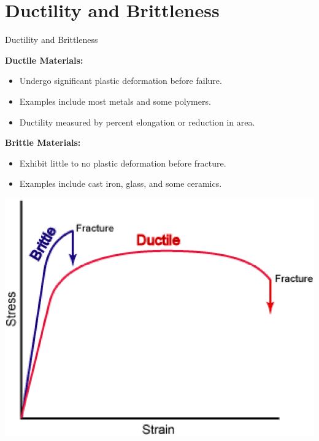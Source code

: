 \documentclass{beamer}
\begin{document}
\section{Ductility and Brittleness}
\begin{frame}{Ductility and Brittleness}
    \begin{minipage}[t]{0.45\textwidth}
        \textbf{Ductile Materials:}
        \begin{itemize}
            \item Undergo significant plastic deformation before failure.
            \item Examples include most metals and some polymers.
            \item Ductility measured by percent elongation or reduction in area.
        \end{itemize}
        \vspace{0.5cm}
        \textbf{Brittle Materials:}
        \begin{itemize}
            \item Exhibit little to no plastic deformation before fracture.
            \item Examples include cast iron, glass, and some ceramics.
        \end{itemize}
    \end{minipage}
    \hfill
    \begin{minipage}[t]{0.5\textwidth}
        \vspace{0pt}
        \includegraphics[width=\textwidth]{Ductile_Brittle.png}
    \end{minipage}
\end{frame}
\end{document}
